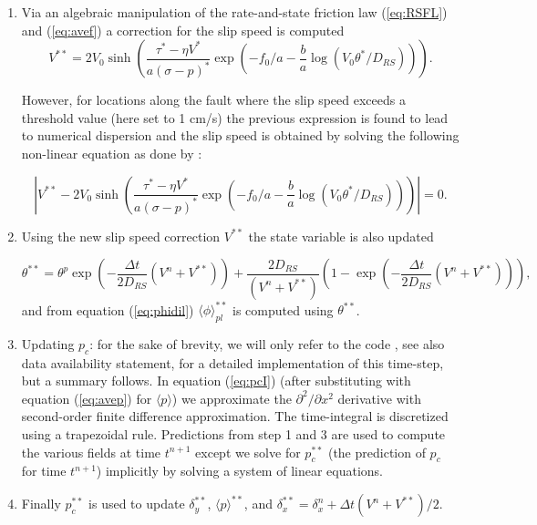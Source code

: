 \documentclass[draft]{agujournal2019}
\begin{document}
\begin{enumerate}
\item Via an algebraic manipulation of the rate-and-state friction law (\ref{eq:RSFL}) and (\ref{eq:avef}) a correction for the slip speed is computed
\begin{equation}
    {V}^{**} = 2 V_0 \sinh \left( \frac{{\tau}^* - \eta V^*}{a (\sigma - p)^*} \exp \left( - f_0/a - \frac{b}{a}\log(V_0 {\theta}^*/D_{RS}) \right) \right).
    \label{eq:FLn}
\end{equation}

However, for locations along the fault where the slip speed exceeds a threshold value (here set to 1 cm/s) the previous expression is found to lead to numerical dispersion and the slip speed is obtained by solving the following non-linear equation as done by :
 
 \begin{equation}
    \left|     {V}^{**} - 2 V_0 \sinh \left( \frac{{\tau}^* - \eta V^*}{a (\sigma - p)^*} \exp \left( - f_0/a - \frac{b}{a}\log(V_0 {\theta}^*/D_{RS}) \right) \right) \right| = 0 .
    \label{eq:FLnim}
\end{equation}


\item Using the new slip speed correction $V^{**}$ the state variable is also updated

\begin{equation}
    \theta^{**} = \theta^p \exp \left( - \frac{\Delta t}{2 D_{RS}} (V^n + V^{**})  \right) + \frac{2 D_{RS}}{(V^n + V^{**})} \left( 1 - \exp \left( - \frac{\Delta t}{2 D_{RS}} (V^n + V^{**})  \right)  \right),
\end{equation}
and from equation (\ref{eq:phidil}) $\langle \phi \rangle_{pl}^{**}$ is computed using $\theta^{**}$.

\item Updating $p_c$: for the sake of brevity, we will only refer to the code \cite{elias_rafn_heimisson_Poro_SBIM}, see also data availability statement, for a detailed implementation of this time-step, but a summary follows. In equation (\ref{eq:pcI}) (after substituting with equation (\ref{eq:avep}) for $\langle p \rangle$) we approximate the $\partial^2/\partial x^2$ derivative with second-order finite difference approximation. The time-integral is discretized using a trapezoidal rule. Predictions from step 1 and 3 are used to compute the various fields at time $t^{n+1}$ except we solve for $p_c^{**}$ (the prediction of $p_c$ for time $t^{n+1}$) implicitly by solving a system of linear equations. 

\item Finally $p_c^{**}$ is used to update $\delta_{y}^{**}$, $\langle p \rangle ^{**}$, and $\delta_x^{**} = \delta_x^{n} + \Delta t (V^n + V^{**})/2$.

\end{enumerate}
\end{document}
